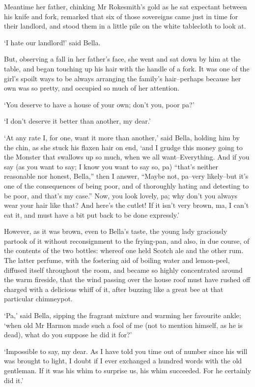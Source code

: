 Meantime her father, chinking Mr Rokesmith’s gold as he sat expectant
between his knife and fork, remarked that six of those sovereigns came
just in time for their landlord, and stood them in a little pile on the
white tablecloth to look at.

‘I hate our landlord!’ said Bella.

But, observing a fall in her father’s face, she went and sat down by him
at the table, and began touching up his hair with the handle of a fork.
It was one of the girl’s spoilt ways to be always arranging the family’s
hair--perhaps because her own was so pretty, and occupied so much of her
attention.

‘You deserve to have a house of your own; don’t you, poor pa?’

‘I don’t deserve it better than another, my dear.’

‘At any rate I, for one, want it more than another,’ said Bella, holding
him by the chin, as she stuck his flaxen hair on end, ‘and I grudge
this money going to the Monster that swallows up so much, when we all
want--Everything. And if you say (as you want to say; I know you want
to say so, pa) “that’s neither reasonable nor honest, Bella,” then I
answer, “Maybe not, pa--very likely--but it’s one of the consequences
of being poor, and of thoroughly hating and detesting to be poor, and
that’s my case.” Now, you look lovely, pa; why don’t you always wear
your hair like that? And here’s the cutlet! If it isn’t very brown, ma,
I can’t eat it, and must have a bit put back to be done expressly.’

However, as it was brown, even to Bella’s taste, the young lady
graciously partook of it without reconsignment to the frying-pan, and
also, in due course, of the contents of the two bottles: whereof
one held Scotch ale and the other rum. The latter perfume, with
the fostering aid of boiling water and lemon-peel, diffused itself
throughout the room, and became so highly concentrated around the warm
fireside, that the wind passing over the house roof must have rushed off
charged with a delicious whiff of it, after buzzing like a great bee at
that particular chimneypot.

‘Pa,’ said Bella, sipping the fragrant mixture and warming her favourite
ankle; ‘when old Mr Harmon made such a fool of me (not to mention
himself, as he is dead), what do you suppose he did it for?’

‘Impossible to say, my dear. As I have told you time out of number since
his will was brought to light, I doubt if I ever exchanged a hundred
words with the old gentleman. If it was his whim to surprise us, his
whim succeeded. For he certainly did it.’

